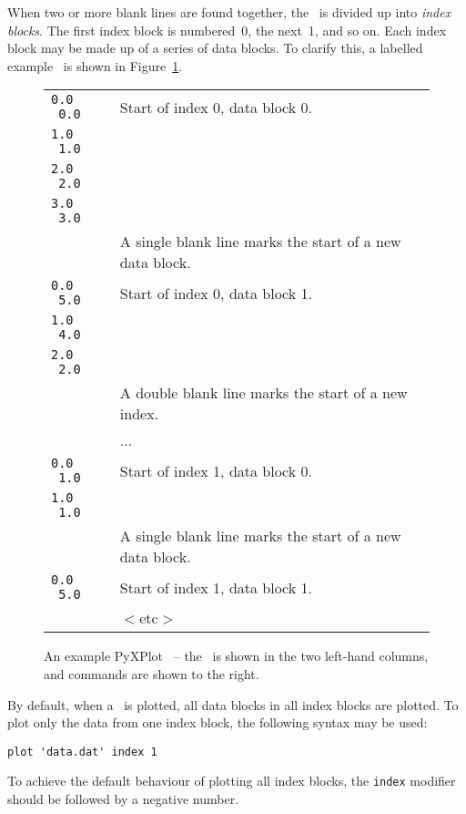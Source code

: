 When two or more blank lines are found together, the \datafile\ is divided up
into {\it index blocks}. The first index block is numbered~0, the next~1, and
so on. Each index block may be made up of a series of data blocks. To clarify
this, a labelled example \datafile\ is shown in Figure~\ref{sample_datafile}.

\begin{figure}
\begin{tabular}{p{2.2cm}l}
\hline
{\tt 0.0 \ 0.0} & Start of index 0, data block 0. \\
{\tt 1.0 \ 1.0} & \\
{\tt 2.0 \ 2.0} & \\
{\tt 3.0 \ 3.0} & \\
                   & A single blank line marks the start of a new data block. \\
{\tt 0.0 \ 5.0} & Start of index 0, data block 1. \\
{\tt 1.0 \ 4.0} & \\
{\tt 2.0 \ 2.0} & \\
                   & A double blank line marks the start of a new index. \\
                   & ... \\
{\tt 0.0 \ 1.0} & Start of index 1, data block 0. \\
{\tt 1.0 \ 1.0} & \\
                   & A single blank line marks the start of a new data block. \\
{\tt 0.0 \ 5.0} & Start of index 1, data block 1. \\
                   & $<$etc$>$ \\
\hline
\end{tabular}
\caption{An example PyXPlot \datafile\ -- the \datafile\ is shown in the two left-hand columns, and commands are shown to the right.}
\label{sample_datafile}
\end{figure}

By default, when a \datafile\ is plotted, all data blocks in all index blocks are
plotted. To plot only the data from one index block, the following syntax may
be used:

\begin{verbatim}
plot 'data.dat' index 1
\end{verbatim}

\noindent To achieve the default behaviour of plotting all index blocks, the
{\tt index} modifier should be followed by a negative number.


